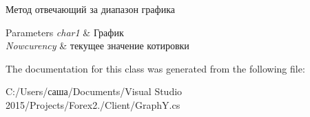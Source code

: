 Метод отвечающий за диапазон графика 


\begin{DoxyParams}{Parameters}
{\em char1} & График\\
\hline
{\em Nowcurency} & текущее значение котировки\\
\hline
\end{DoxyParams}


The documentation for this class was generated from the following file\+:\begin{DoxyCompactItemize}
\item 
C\+:/\+Users/саша/\+Documents/\+Visual Studio 2015/\+Projects/\+Forex2./\+Client/Graph\+Y.\+cs\end{DoxyCompactItemize}
